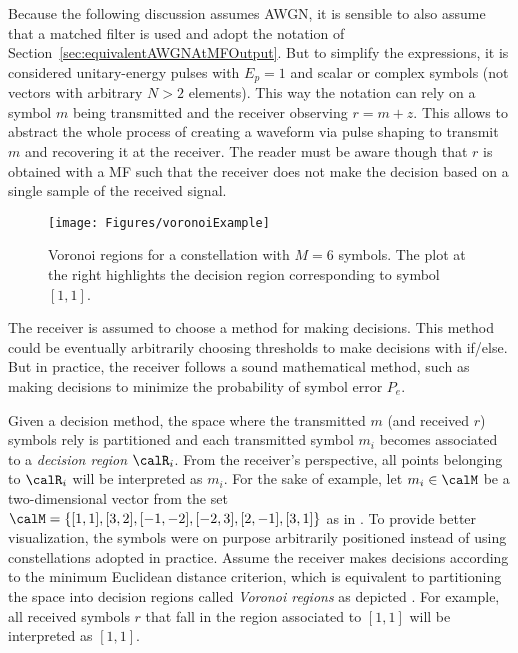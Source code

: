 Because the following discussion assumes AWGN, it is sensible to also assume that a matched filter is used and adopt the notation of Section~\ref{sec:equivalentAWGNAtMFOutput}. But to simplify the expressions, it is considered unitary-energy pulses with $E_p=1$ and scalar or complex symbols (not vectors with arbitrary $N>2$ elements). This way the notation can rely on a symbol $m$ being transmitted and the receiver observing $r = m +  z$. This allows to abstract the whole process of creating a waveform via pulse shaping to transmit $m$ and recovering it at the receiver. The reader must be aware though that $r$ is obtained with a MF such that the receiver does not make the decision based on a single sample of the received signal. 

\begin{figure}[htbp]
\centering
\texttt{[image: Figures/voronoiExample]}
\caption[{Voronoi regions for a constellation with $M=6$ hypothetical symbols.}]{Voronoi regions for a constellation with $M=6$ symbols.  The plot at the right highlights the decision region corresponding to symbol $[1,1]$.\label{fig:voronoiExample}}
\end{figure}

The receiver is assumed to choose a method for making decisions. This method could be eventually arbitrarily choosing thresholds to make decisions with if/else. But in practice, the receiver follows a sound mathematical method, such as making decisions to minimize the probability of symbol error $P_e$.

Given a decision method, the space where the transmitted $m$ (and received $r$) symbols rely is partitioned and each transmitted symbol $m_i$ becomes associated to a \emph{decision region} $\calR_i$. From the receiver's perspective, all points belonging to $\calR_i$ will be interpreted as $m_i$. For the sake of example, let $m_i \in \calM$ be a two-dimensional vector from the set $\calM = \{[1,1], [3,2], [-1,-2], [-2,3], [2, -1], [3, 1]\}$ as in . To provide better visualization, the symbols were on purpose arbitrarily positioned instead of using constellations adopted in practice. Assume the receiver makes decisions according to the minimum Euclidean distance criterion, which is equivalent to partitioning the space into decision regions called \emph{Voronoi regions} as depicted . For example, all received symbols $r$ that fall in the region associated to $[1,1]$ will be interpreted as $[1,1]$.

